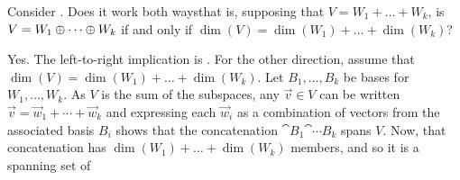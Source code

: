 \begin{exercises}
  \recommended \item 
    Consider .
    Does it work both ways\Dash that is,
    supposing that \( V=W_1+\dots+ W_k \),
    is \( V=W_1\oplus\cdots\oplus W_k \) if and only if
    \( \dim(V)=\dim(W_1)+\dots+\dim(W_k) \)?
    \begin{answer}
      Yes.
      The left-to-right implication is
      .
      For the other direction,
      assume that \( \dim(V)=\dim(W_1)+\dots+\dim(W_k) \).
      Let \( B_1,\dots, B_k \) be bases for \( W_1,\dots, W_k \).
      As $V$ is the sum of the subspaces, any \( \vec{v}\in V \) can be written
      \( \vec{v}=\vec{w}_1+\cdots+\vec{w}_k \) and expressing each
      \( \vec{w}_i \) as a combination of vectors from the associated
      basis \( B_i \) shows that the concatenation
      \( \cat{B_1}{\cat{\cdots}{B_k}}  \) spans \( V \).
      Now, that concatenation has
      \( \dim(W_1)+\dots+\dim(W_k) \) members, and so it is a spanning set of 

\end{answer}
\end{exercises}
